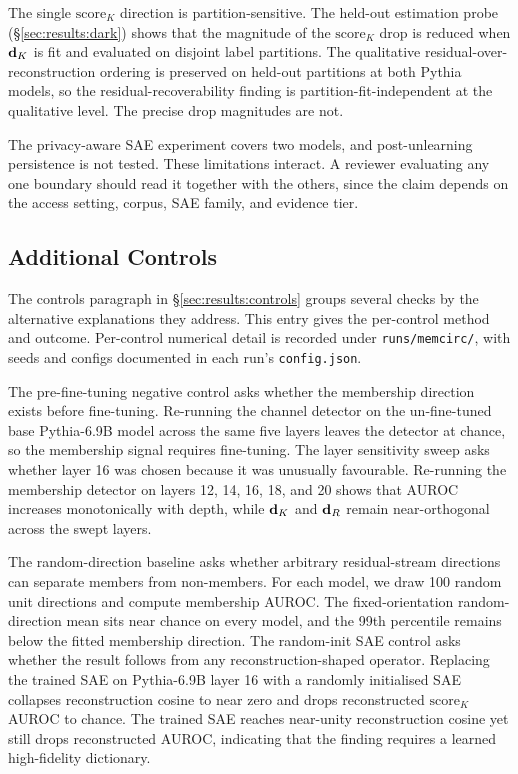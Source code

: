 The single $\mathrm{score}_K$ direction is partition-sensitive. The held-out estimation probe (\S\ref{sec:results:dark}) shows that the magnitude of the $\mathrm{score}_K$ drop is reduced when $\mathbf{d}_K$ is fit and evaluated on disjoint label partitions. The qualitative residual-over-reconstruction ordering is preserved on held-out partitions at both Pythia models, so the residual-recoverability finding is partition-fit-independent at the qualitative level. The precise drop magnitudes are not.

The privacy-aware SAE experiment covers two models, and post-unlearning persistence is not tested. These limitations interact. A reviewer evaluating any one boundary should read it together with the others, since the claim depends on the access setting, corpus, SAE family, and evidence tier.

\subsection{Additional Controls}
\label{app:additional_controls}

The controls paragraph in \S\ref{sec:results:controls} groups several checks by the alternative explanations they address. This entry gives the per-control method and outcome. Per-control numerical detail is recorded under \texttt{runs/memcirc/}, with seeds and configs documented in each run's \texttt{config.json}.

The pre-fine-tuning negative control asks whether the membership direction exists before fine-tuning. Re-running the channel detector on the un-fine-tuned base Pythia-6.9B model across the same five layers leaves the detector at chance, so the membership signal requires fine-tuning. The layer sensitivity sweep asks whether layer 16 was chosen because it was unusually favourable. Re-running the membership detector on layers 12, 14, 16, 18, and 20 shows that AUROC increases monotonically with depth, while $\mathbf{d}_K$ and $\mathbf{d}_R$ remain near-orthogonal across the swept layers.

The random-direction baseline asks whether arbitrary residual-stream directions can separate members from non-members. For each model, we draw 100 random unit directions and compute membership AUROC. The fixed-orientation random-direction mean sits near chance on every model, and the 99th percentile remains below the fitted membership direction. The random-init SAE control asks whether the result follows from any reconstruction-shaped operator. Replacing the trained SAE on Pythia-6.9B layer 16 with a randomly initialised SAE collapses reconstruction cosine to near zero and drops reconstructed $\mathrm{score}_K$ AUROC to chance. The trained SAE reaches near-unity reconstruction cosine yet still drops reconstructed AUROC, indicating that the finding requires a learned high-fidelity dictionary.

